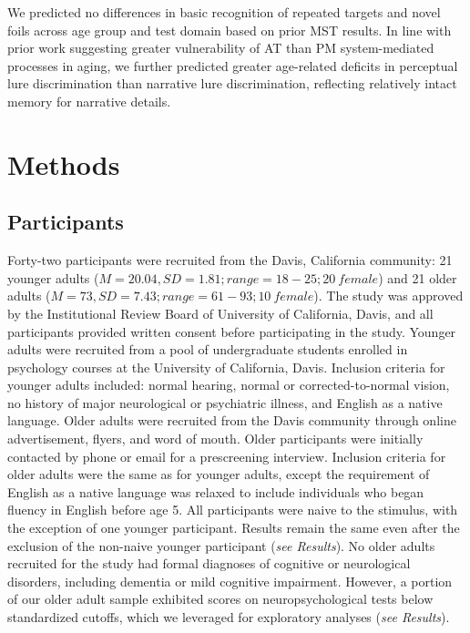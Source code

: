 \documentclass[11pt]{article}
\begin{document}
We predicted no differences in basic recognition of repeated targets and novel foils across age group and test domain based on prior MST results. In line with prior work suggesting greater vulnerability of AT than PM system-mediated processes in aging, we further predicted greater age-related deficits in perceptual lure discrimination than narrative lure discrimination, reflecting relatively intact memory for narrative details.

\section*{Methods}
\label{sec:methods}

\subsection*{Participants}
Forty-two participants were recruited from the Davis, California community: 21 younger adults ($M = 20.04, SD = 1.81; range = 18-25; 20 \ female$) and 21 older adults ($M = 73, SD = 7.43; range = 61-93; 10 \ female$). The study was approved by the Institutional Review Board of University of California, Davis, and all participants provided written consent before participating in the study. Younger adults were recruited from a pool of undergraduate students enrolled in psychology courses at the University of California, Davis. Inclusion criteria for younger adults included: normal hearing, normal or corrected-to-normal vision, no history of major neurological or psychiatric illness, and English as a native language. Older adults were recruited from the Davis community through online advertisement, flyers, and word of mouth. Older participants were initially contacted by phone or email for a prescreening interview. Inclusion criteria for older adults were the same as for younger adults, except the requirement of English as a native language was relaxed to include individuals who began fluency in English before age 5. All participants were naive to the stimulus, with the exception of one younger participant. Results remain the same even after the exclusion of the non-naive younger participant (\textit{see Results}). No older adults recruited for the study had formal diagnoses of cognitive or neurological disorders, including dementia or mild cognitive impairment. However, a portion of our older adult sample exhibited scores on neuropsychological tests below standardized cutoffs, which we leveraged for exploratory analyses (\textit{see Results}).
\end{document}
